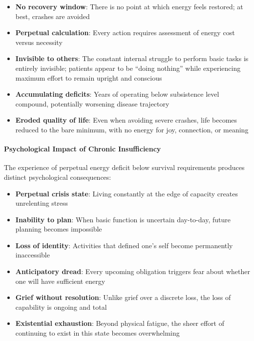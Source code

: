 \begin{itemize}
    \item \textbf{No recovery window}: There is no point at which energy feels restored; at best, crashes are avoided
    \item \textbf{Perpetual calculation}: Every action requires assessment of energy cost versus necessity
    \item \textbf{Invisible to others}: The constant internal struggle to perform basic tasks is entirely invisible; patients appear to be ``doing nothing'' while experiencing maximum effort to remain upright and conscious
    \item \textbf{Accumulating deficits}: Years of operating below subsistence level compound, potentially worsening disease trajectory
    \item \textbf{Eroded quality of life}: Even when avoiding severe crashes, life becomes reduced to the bare minimum, with no energy for joy, connection, or meaning
\end{itemize}

\paragraph{Psychological Impact of Chronic Insufficiency}

The experience of perpetual energy deficit below survival requirements produces distinct psychological consequences:

\begin{itemize}
    \item \textbf{Perpetual crisis state}: Living constantly at the edge of capacity creates unrelenting stress
    \item \textbf{Inability to plan}: When basic function is uncertain day-to-day, future planning becomes impossible
    \item \textbf{Loss of identity}: Activities that defined one's self become permanently inaccessible
    \item \textbf{Anticipatory dread}: Every upcoming obligation triggers fear about whether one will have sufficient energy
    \item \textbf{Grief without resolution}: Unlike grief over a discrete loss, the loss of capability is ongoing and total
    \item \textbf{Existential exhaustion}: Beyond physical fatigue, the sheer effort of continuing to exist in this state becomes overwhelming
\end{itemize}

